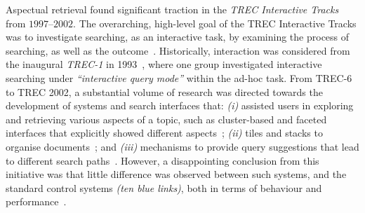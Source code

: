 Aspectual retrieval found significant traction in the \textit{TREC Interactive Tracks} from $1997$--$2002$. The overarching, high-level goal of the TREC Interactive Tracks was to investigate searching, as an interactive task, by examining the process of searching, as well as the outcome~\cite{over2001trec}. Historically, interaction was considered from the inaugural \emph{TREC-1} in 1993~\cite{harman1993trec1}, where one group investigated interactive searching under \emph{``interactive query mode''} within the ad-hoc task. From TREC-6 to TREC 2002, a substantial volume of research was directed towards the development of systems and search interfaces that: \emph{(i)} assisted users in exploring and retrieving various aspects of a topic, such as cluster-based and faceted interfaces that explicitly showed different aspects~\cite{villa2009aspect_interface,mcdonald1998interactive}; \emph{(ii)} tiles and stacks to organise documents~\cite{hearst1995tilebars,hearst1997texttiling,harper2006piling,iwata2012tilediversified}; and \emph{(iii)} mechanisms to provide query suggestions that lead to different search paths~\cite{umemoto2016scentbar,kato2012query_suggestion}. However, a disappointing conclusion from this initiative was that little difference was observed between such systems, and the standard control systems \emph{(ten blue links)}, both in terms of behaviour and performance~\cite{voorhees05trec}.





